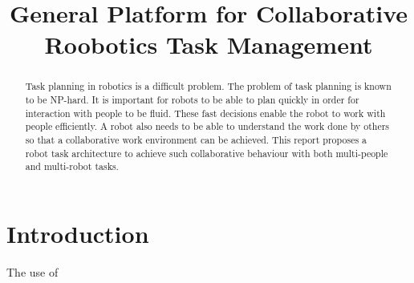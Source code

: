 \documentclass[conference]{IEEEtran}
\begin{document}
\title{General Platform for Collaborative Roobotics Task Management}

\author{
}

\maketitle

\IEEEpeerreviewmaketitle
\begin{abstract}
Task planning in robotics is a difficult problem. The problem of task planning is known to be NP-hard. It is important for robots to be able to plan quickly in order for interaction with people to be fluid. These fast decisions enable the robot to work with people efficiently. A robot also needs to be able to understand the work done by others so that a collaborative work environment can be achieved. This report proposes a robot task architecture to achieve such collaborative behaviour with both multi-people and multi-robot tasks.
\end{abstract}

\section{Introduction}
The use of 
\end{document}

